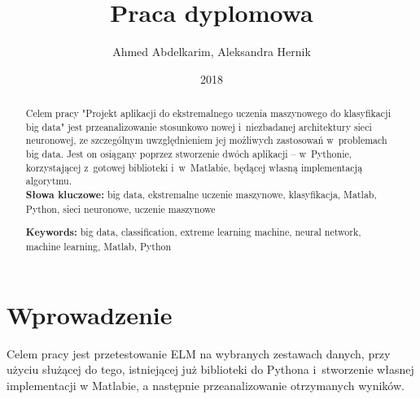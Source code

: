 \documentclass[pl]{minipw} %
\title{Praca dyplomowa} %
\author{Ahmed Abdelkarim, Aleksandra Hernik}
\date{2018}
\begin{document}
\sloppy






\begin{abstract}
\setcounter{page}{1}
Celem pracy "Projekt aplikacji do ekstremalnego uczenia maszynowego do klasyfikacji big data" jest przeanalizowanie stosunkowo nowej i~niezbadanej architektury sieci neuronowej, ze szczególnym uwzględnieniem jej możliwych zastosowań w~problemach big data.
Jest on osiągany poprzez stworzenie dwóch aplikacji -- w~Pythonie, korzystającej z~gotowej biblioteki i~w~Matlabie, będącej własną implementacją algorytmu.\\

\noindent \textbf{Słowa kluczowe:} big data, ekstremalne uczenie maszynowe, klasyfikacja, Matlab, Python, sieci neuronowe, uczenie maszynowe
\end{abstract}


{
\begin{abstract}



\noindent \textbf{Keywords:} big data, classification, extreme learning machine, neural network, machine learning, Matlab, Python
\end{abstract}}

\makestatement


\cleardoublepage
\tableofcontents


\cleardoublepage
\pagestyle{fancy}

\chapter*{Wprowadzenie}
Celem pracy jest przetestowanie ELM na wybranych zestawach danych, przy użyciu służącej do tego, istniejącej już biblioteki do Pythona i~stworzenie własnej implementacji w Matlabie, a następnie przeanalizowanie otrzymanych wyników.
\end{document}
